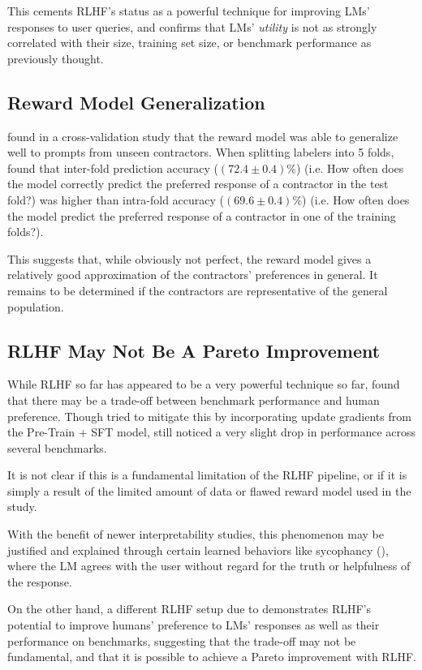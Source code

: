 \documentclass{article} %
\begin{document}
This cements RLHF's status as a powerful technique for
improving LMs' responses to user queries, and confirms that
LMs' \textit{utility} is not as strongly correlated with their size, training set size,
or benchmark performance as previously thought.

\subsection{Reward Model Generalization}
\cite{InstructGPT-2022} found in a cross-validation study that the reward model
was able to generalize well to prompts from unseen contractors.
When splitting labelers into 5 folds, \cite{InstructGPT-2022} found that inter-fold
prediction accuracy ($(72.4 \pm 0.4) \%$) (i.e. How often does the model correctly predict
the preferred response of a contractor in the test fold?) was higher 
than intra-fold accuracy ($(69.6 \pm 0.4) \%$) (i.e. How often does the model
predict the preferred response of a contractor in one of the training folds?).

This suggests that, while obviously not perfect, the reward model
gives a relatively good approximation of the contractors' preferences
in general. It remains to be determined if the contractors
are representative of the general population.

\subsection{RLHF May Not Be A Pareto Improvement} \label{sec:not-pareto}
While RLHF so far has appeared to be a very powerful technique
so far, \cite{InstructGPT-2022} found that there may be a trade-off between 
benchmark performance and human preference.
Though \cite{InstructGPT-2022} tried to mitigate this by incorporating
update gradients from the Pre-Train + SFT model, \cite{InstructGPT-2022} still noticed
a very slight drop in performance across several benchmarks.

It is not clear if this is a fundamental limitation of the RLHF
pipeline, or if it is simply a result of the limited amount of data
or flawed reward model used in the study.

With the benefit of newer interpretability studies, this phenomenon
may be justified and explained through certain learned behaviors like
sycophancy (\cite{Sharma-et-al-2023}), where the LM agrees with the user
without regard for the truth or helpfulness of the response.

On the other hand, a different RLHF setup due to \cite{Zheng-et-al-2024}
demonstrates RLHF's potential to improve humans' preference to LMs' responses
as well as their performance on benchmarks, suggesting that
the trade-off may not be fundamental, and that it is possible to
achieve a Pareto improvement with RLHF.
\end{document}
